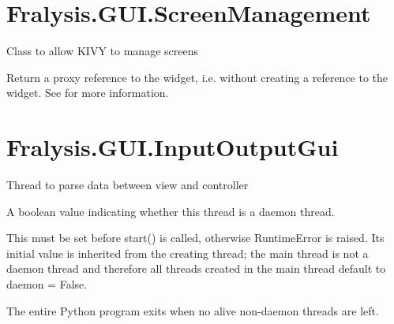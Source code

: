 \documentclass[letterpaper,10pt,english]{sphinxmanual}
\begin{document}
\chapter{Fralysis.GUI.ScreenManagement}
\label{\detokenize{index:module-Fralysis.GUI.ScreenManagement}}\label{\detokenize{index:fralysis-gui-screenmanagement}}
Class to allow KIVY to manage screens

\begin{fulllineitems}
\label{\detokenize{index:Fralysis.GUI.ScreenManagement.proxy_ref}}
Return a proxy reference to the widget, i.e. without creating a
reference to the widget. See  for more information.


\end{fulllineitems}



\chapter{Fralysis.GUI.InputOutputGui}
\label{\detokenize{index:module-Fralysis.GUI.InputOutputGui}}\label{\detokenize{index:fralysis-gui-inputoutputgui}}
Thread to parse data between view and controller

\begin{fulllineitems}
\label{\detokenize{index:Fralysis.GUI.InputOutputGui.daemon}}
A boolean value indicating whether this thread is a daemon thread.

This must be set before start() is called, otherwise RuntimeError is
raised. Its initial value is inherited from the creating thread; the
main thread is not a daemon thread and therefore all threads created in
the main thread default to daemon = False.

The entire Python program exits when no alive non-daemon threads are
left.

\end{fulllineitems}
\end{document}

